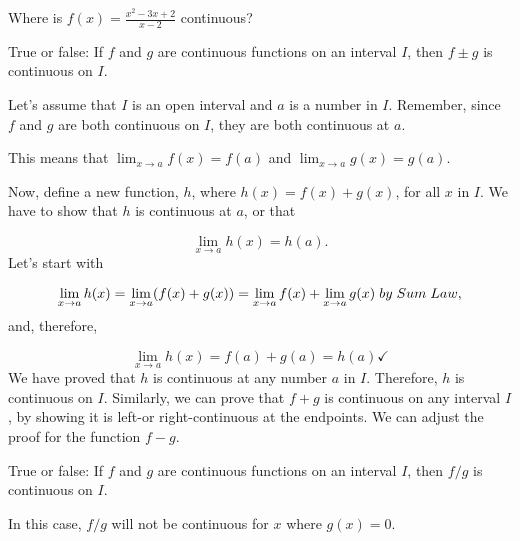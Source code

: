 \documentclass{ximera}
\begin{document}
\begin{question}
  Where is $f(x) = \frac{x^2-3x+2}{x-2}$ continuous?
  \begin{prompt}
  \begin{multipleChoice}
  \end{multipleChoice}
  \end{prompt}
\end{question}
\begin{question}
  True or false: If $f$ and $g$ are continuous functions on an
  interval $I$, then $f\pm g$ is continuous on $I$.
  \begin{prompt}
  \begin{multipleChoice}
  \end{multipleChoice}
  \begin{feedback}
     Let's assume that $I$ is an open interval and $a$ is a number in $I$. Remember, since $f$ and $g$ are both continuous on $I$, they are both continuous at $a$. 
     
     This means that $ \lim_{x\to a}f(x)=f(a)$ and $ \lim_{x\to a}g(x)=g(a)$.
     
      Now, define a new function, $h$, where $h(x)= f(x)+g(x)$, for all $x$ in $I$. We have to show that $h$ is continuous at $a$, or that
    
    \[
    \lim_{x\to a} h(x) = h(a).
    \]
    Let's start with
     
    \[
    \lim_{x\to a} h(x) =  \lim_{x\to a} (f(x)+g(x)) = \lim_{x\to a} f(x)+\lim_{x\to a}g(x)\hspace{0.04in}by \hspace{0.04in}Sum\hspace{0.04in} Law,
    \]
    and, therefore,
    
     \[
    \lim_{x\to a} h(x) =  f(a)+g(a)=h(a) \checkmark
    \]
We have proved that $h$ is continuous at  any number $a$ in $I$. Therefore, $h$ is continuous on $I$.
Similarly, we can prove that $f+g$ is continuous on any interval $I$, by showing it is left-or right-continuous at the endpoints.
We can adjust the proof for the function $f-g$.
  \end{feedback}
  \end{prompt}
\end{question}

\begin{question}
  True or false: If $f$ and $g$ are continuous functions on an
  interval $I$, then $f/g$ is continuous on $I$.
  \begin{prompt}
  \begin{multipleChoice}
  \end{multipleChoice}
  \begin{feedback}
    In this case, $f/g$ will not be continuous for $x$ where $g(x) =
    0$.
  \end{feedback}
  \end{prompt}
\end{question}
\end{document}

